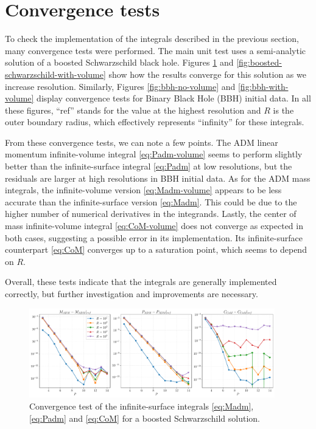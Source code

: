 \documentclass{../document}
\begin{document}
	\section{Convergence tests}
    To check the implementation of the integrals described in the previous section, many convergence tests were performed. The main unit test uses a semi-analytic solution of a boosted Schwarzschild black hole. Figures \ref{fig:boosted-schwarzschild-no-volume} and \ref{fig:boosted-schwarzschild-with-volume} show how the results converge for this solution as we increase resolution. Similarly, Figures \ref{fig:bbh-no-volume} and \ref{fig:bbh-with-volume} display convergence tests for Binary Black Hole (BBH) initial data. In all these figures, “ref” stands for the value at the highest resolution and $R$ is the outer boundary radius, which effectively represents “infinity” for these integrals.

    From these convergence tests, we can note a few points. The ADM linear momentum infinite-volume integral \eqref{eq:Padm-volume} seems to perform slightly better than the infinite-surface integral \eqref{eq:Padm} at low resolutions, but the residuals are larger at high resolutions in BBH initial data. As for the ADM mass integrals, the infinite-volume version \eqref{eq:Madm-volume} appears to be less accurate than the infinite-surface version \eqref{eq:Madm}. This could be due to the higher number of numerical derivatives in the integrands. Lastly, the center of mass infinite-volume integral \eqref{eq:CoM-volume} does not converge as expected in both cases, suggesting a possible error in its implementation. Its infinite-surface counterpart \eqref{eq:CoM} converges up to a saturation point, which seems to depend on $R$.

    Overall, these tests indicate that the integrals are generally implemented correctly, but further investigation and improvements are necessary.

    \begin{figure}
      \centering
      \includegraphics[width=0.95\textwidth]{assets/BoostedSchwarzschild_NoVolume.pdf}
      \caption{Convergence test of the infinite-surface integrals \eqref{eq:Madm}, \eqref{eq:Padm} and \eqref{eq:CoM} for a boosted Schwarzschild solution.}
      \label{fig:boosted-schwarzschild-no-volume}
    \end{figure}
\end{document}
